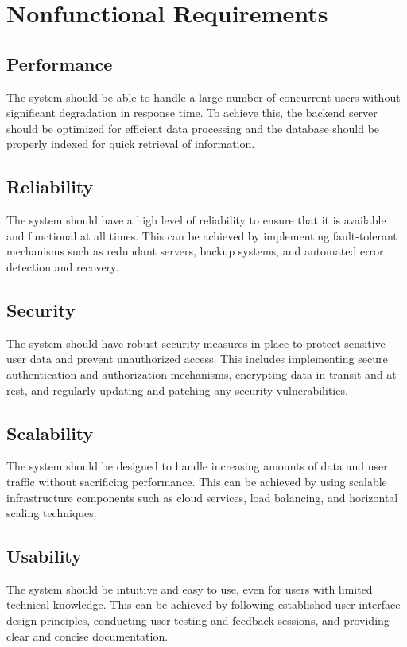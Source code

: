 
\section{Nonfunctional Requirements}

\subsection{Performance}
The system should be able to handle a large number of concurrent users without significant degradation in response time. To achieve this, the backend server should be optimized for efficient data processing and the database should be properly indexed for quick retrieval of information.

\subsection{Reliability}
The system should have a high level of reliability to ensure that it is available and functional at all times. This can be achieved by implementing fault-tolerant mechanisms such as redundant servers, backup systems, and automated error detection and recovery.

\subsection{Security}
The system should have robust security measures in place to protect sensitive user data and prevent unauthorized access. This includes implementing secure authentication and authorization mechanisms, encrypting data in transit and at rest, and regularly updating and patching any security vulnerabilities.

\subsection{Scalability}
The system should be designed to handle increasing amounts of data and user traffic without sacrificing performance. This can be achieved by using scalable infrastructure components such as cloud services, load balancing, and horizontal scaling techniques.

\subsection{Usability}
The system should be intuitive and easy to use, even for users with limited technical knowledge. This can be achieved by following established user interface design principles, conducting user testing and feedback sessions, and providing clear and concise documentation.

